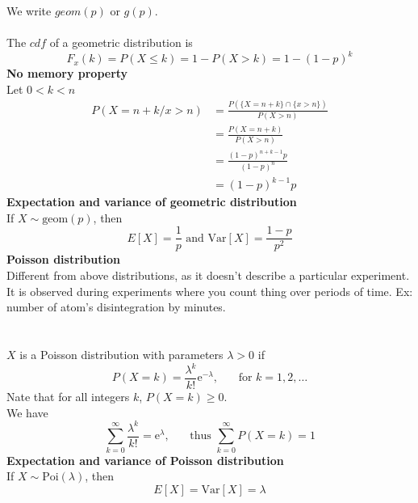 \documentclass[12pt,a4paper,draft]{report}
\begin{document}
We write $geom(p)$ or $g(p)$.\\\\
The $cdf$ of a geometric distribution is
\begin{equation}
F_x(k)=P(X\leq k)=1-P(X>k)=1-(1-p)^k
\end{equation}
\textbf{No memory property}\\
Let $0<k<n$
\begin{align}
P(X=n+k/x>n)&=\frac{P(\{X=n+k\}\cap\{x>n\})}{P(X>n)}\\
&=\frac{P(X=n+k)}{P(X>n)}\\
&=\frac{(1-p)^{n+k-1}p}{(1-p)^n}\\
&=(1-p)^{k-1}p
\end{align}
\textbf{Expectation and variance of geometric distribution}\\
If $X\sim \text{geom}(p)$, then
\begin{equation}
E[X]=\frac{1}{p}\text{ and Var}[X]=\frac{1-p}{p^2}
\end{equation}
\textbf{Poisson distribution}\\
Different from above distributions, as it doesn't describe a particular experiment. It is observed during experiments where you count thing over periods of time. Ex: number of atom's disintegration by minutes.\\
\\\\
$X$ is a Poisson distribution with parameters $\lambda >0$ if
\begin{equation}
P(X=k)=\frac{\lambda ^k}{k!}\mathrm{e}^{-\lambda},\phantom{mm}\text{for }k=1,2,\ldots
\end{equation}
Nate that for all integers $k$, $P(X=k)\geq 0$.\\
We have
\begin{equation}
\sum_{k=0}^{\infty}\frac{\lambda ^k}{k!}=\mathrm{e}^{\lambda},\phantom{mm}\text{thus }\sum_{k=0}^{\infty}P(X=k)=1
\end{equation}
\textbf{Expectation and variance of Poisson distribution}\\
If $X\sim\text{Poi}(\lambda)$, then
\begin{equation}
E[X]=\text{Var}[X]=\lambda
\end{equation}
\end{document}
